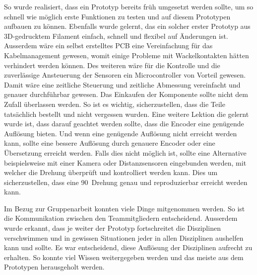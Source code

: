 So wurde realisiert, dass ein Prototyp bereits früh umgesetzt werden sollte, um so schnell wie möglich erste Funktionen zu testen und auf diesem Prototypen aufbauen zu können. Ebenfalls wurde gelernt, das ein solcher erster Prototyp aus 3D-gedrucktem Filament einfach, schnell und flexibel auf Änderungen ist. Ausserdem wäre ein selbst erstelltes PCB eine Vereinfachung für das Kabelmanagement gewesen, womit einige Probleme mit Wackelkontakten hätten verhindert werden können.
Des weiteren wäre für die Kontrolle und die zuverlässige Ansteuerung der Sensoren ein Microcontroller von Vorteil gewesen. Damit wäre eine zeitliche Steuerung und zeitliche Abmessung vereinfacht und genauer durchführbar gewesen. Das Einkaufen der Komponente sollte nicht dem Zufall überlassen werden. So ist es wichtig, sicherzustellen, dass die Teile tatsächlich bestellt und nicht vergessen wurden. Eine weitere Lektion die gelernt wurde ist, dass darauf geachtet werden sollte, dass die Encoder eine genügende Auflösung bieten. Und wenn eine genügende Auflösung nicht erreicht werden kann, sollte eine bessere Auflösung durch genauere Encoder oder eine Übersetzung erreicht werden. Falls dies nicht möglich ist, sollte eine  Alternative beispielsweise mit einer Kamera oder Distanzsensoren eingebunden werden, mit welcher die Drehung überprüft und kontrolliert werden kann. Dies um sicherzustellen, dass eine 90\textdegree\ Drehung genau und reproduzierbar erreicht werden kann.

Im Bezug zur Gruppenarbeit konnten viele Dinge mitgenommen werden. So ist die Kommunikation zwischen den Teammitgliedern entscheidend. Ausserdem wurde erkannt, dass je weiter der Prototyp fortschreitet die Disziplinen verschwimmen und in gewissen Situationen jeder in allen Disziplinen aushelfen kann und sollte. Es war entscheidend, diese Auflösung der Disziplinen aufrecht zu erhalten. So konnte viel Wissen weitergegeben werden und das meiste aus dem Prototypen herausgeholt werden.

